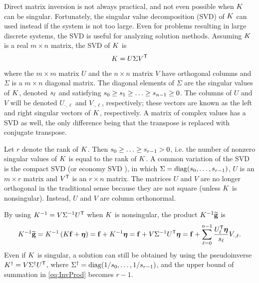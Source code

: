 Direct matrix inversion is not always practical, and not even possible when $K$ can be singular. Fortunately, the singular value decomposition (SVD) of $K$ can used instead if the system is not too large. Even for problems resulting in large discrete systems, the SVD is useful for analyzing solution methods.  Assuming $K$ is a real $m \times n$ matrix, the SVD of $K$ is
\begin{equation}
K = U\Sigma{V}^\mathsf{T}
\label{eq:SVD}
\end{equation}
where the $m \times m$ matrix $U$ and the $n \times n$ matrix $V$ have orthogonal columns and $\Sigma$ is a $m \times n$ diagonal matrix. The diagonal elements of $\Sigma$ are the singular values of $K$, denoted $s_\ell$ and satisfying $s_0 \geq s_1 \geq \ldots \geq s_{n-1} \geq 0$. The columns of $U$ and $V$ will be denoted $U_{\cdot,\ell}$ and $V_{\cdot,\ell}$, respectively; these vectors are known as the left and right singular vectors of $K$, respectively. A matrix of complex values has a SVD as well, the only difference being that the transpose is replaced with conjugate transpose. \par
Let $r$ denote the rank of $K$. Then $s_0 \geq \ldots \geq s_{r-1} > 0$, i.e. the number of nonzero singular values of $K$ is equal to the rank of $K$.  A common variation of the SVD is the compact SVD (or economy SVD \cite{GolubVanLoan2013}), in which $\Sigma = \operatorname{diag}(s_0,\ldots,s_{r-1})$, $U$ is an $m \times r$ matrix and ${V}^\mathsf{T}$ is an $r \times n$ matrix. The matrices $U$ and $V$ are no longer orthogonal in the traditional sense because they are not square (unless $K$ is nonsingular). Instead, $U$ and $V$ are column orthonormal. \par 
By using $K^{-1} = V\Sigma^{-1}{U}^\mathsf{T}$ when $K$ is nonsingular, the product $K^{-1}\widetilde{\mathbf{g}}$ is
\begin{equation}
K^{-1}\widetilde{\mathbf{g}} = K^{-1}\left(K\mathbf{f} + \boldsymbol{\eta}\right) = \mathbf{f} + K^{-1}\boldsymbol{\eta} = \mathbf{f} + V\Sigma^{-1}{U}^\mathsf{T}\boldsymbol{\eta} = \mathbf{f} + \sum_{\ell = 0}^{n-1} \frac{{U}^\mathsf{T}_\ell\boldsymbol{\eta}}{s_\ell}V_{\cdot,\ell}. 
\label{eq:InvProd}
\end{equation}
Even if $K$ is singular, a solution can still be obtained by using the pseudoinverse $K^\dagger = V{\Sigma^\dagger}{U}^\mathsf{T}$, where $\Sigma^\dagger = \operatorname{diag}(1/s_0,\ldots,1/s_{r-1})$, and the upper bound of summation in \eqref{eq:InvProd} becomes $r-1$. 
